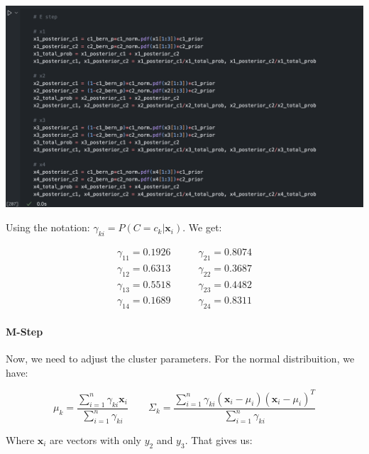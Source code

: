 \documentclass[12pt]{article}
\begin{document}
\begin{enumerate}[leftmargin=\labelsep]
    \begin{center}
        \includegraphics[scale=0.45]{images/code2.png}
    \end{center}
    
    \vskip 4cm

    Using the notation: $\gamma_{ki}=P(C = c_k |\mathbf{x}_i)$. We get:

    \begin{equation}
    \begin{aligned}
        \gamma_{11} = 0.1926 &\qquad \gamma_{21} = 0.8074 \\
        \gamma_{12} = 0.6313 &\qquad \gamma_{22} = 0.3687 \\
        \gamma_{13} = 0.5518 &\qquad \gamma_{23} = 0.4482 \\
        \gamma_{14} = 0.1689 &\qquad \gamma_{24} = 0.8311
    \end{aligned}
    \end{equation}

    \paragraph{M-Step} Now, we need to adjust the cluster parameters. For the normal distribuition, we have:

    \begin{equation}
        \mu_k = \frac{\sum_{i=1}^{n}\gamma_{ki}\mathbf{x}_i}{\sum_{i=1}^{n}\gamma_{ki}} \qquad \Sigma_k = \frac{\sum_{i=1}^{n}\gamma_{ki}(\mathbf{x}_i-\mu_i)(\mathbf{x}_i-\mu_i)^T}{\sum_{i=1}^{n}\gamma_{ki}}
    \end{equation}

    Where $\mathbf{x}_i$ are vectors with only $y_2$ and $y_3$. That gives us:


\end{enumerate}
\end{document}

